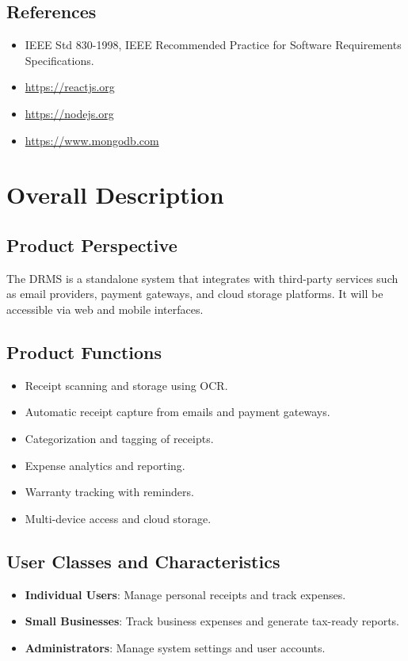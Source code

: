 \documentclass[12pt]{article}
\begin{document}
\subsection{References}
\begin{itemize}
    \item IEEE Std 830-1998, IEEE Recommended Practice for Software Requirements Specifications.
    \item \url{https://reactjs.org}
    \item \url{https://nodejs.org}
    \item \url{https://www.mongodb.com}
\end{itemize}

\section{Overall Description}
\subsection{Product Perspective}
The DRMS is a standalone system that integrates with third-party services such as email providers, payment gateways, and cloud storage platforms. It will be accessible via web and mobile interfaces.

\subsection{Product Functions}
\begin{itemize}
    \item Receipt scanning and storage using OCR.
    \item Automatic receipt capture from emails and payment gateways.
    \item Categorization and tagging of receipts.
    \item Expense analytics and reporting.
    \item Warranty tracking with reminders.
    \item Multi-device access and cloud storage.
\end{itemize}

\subsection{User Classes and Characteristics}
\begin{itemize}
    \item \textbf{Individual Users}: Manage personal receipts and track expenses.
    \item \textbf{Small Businesses}: Track business expenses and generate tax-ready reports.
    \item \textbf{Administrators}: Manage system settings and user accounts.
\end{itemize}
\end{document}
